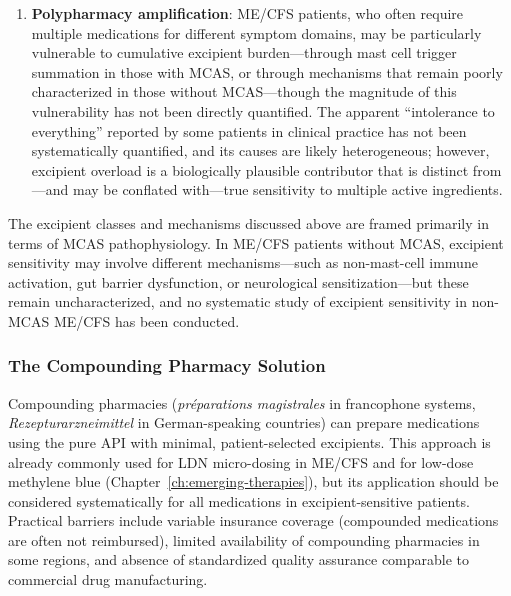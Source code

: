 \begin{enumerate}
    \item \textbf{Polypharmacy amplification}: ME/CFS patients, who often require multiple medications for different symptom domains, may be particularly vulnerable to cumulative excipient burden---through mast cell trigger summation in those with MCAS, or through mechanisms that remain poorly characterized in those without MCAS---though the magnitude of this vulnerability has not been directly quantified. The apparent ``intolerance to everything'' reported by some patients in clinical practice has not been systematically quantified, and its causes are likely heterogeneous; however, excipient overload is a biologically plausible contributor that is distinct from---and may be conflated with---true sensitivity to multiple active ingredients.
\end{enumerate}

The excipient classes and mechanisms discussed above are framed primarily in terms of MCAS pathophysiology. In ME/CFS patients without MCAS, excipient sensitivity may involve different mechanisms---such as non-mast-cell immune activation, gut barrier dysfunction, or neurological sensitization---but these remain uncharacterized, and no systematic study of excipient sensitivity in non-MCAS ME/CFS has been conducted.

\subsubsection{The Compounding Pharmacy Solution}
\label{sec:compounding-general}

Compounding pharmacies (\emph{préparations magistrales} in francophone systems, \emph{Rezepturarzneimittel} in German-speaking countries) can prepare medications using the pure API with minimal, patient-selected excipients. This approach is already commonly used for LDN micro-dosing in ME/CFS and for low-dose methylene blue (Chapter~\ref{ch:emerging-therapies}), but its application should be considered systematically for all medications in excipient-sensitive patients. Practical barriers include variable insurance coverage (compounded medications are often not reimbursed), limited availability of compounding pharmacies in some regions, and absence of standardized quality assurance comparable to commercial drug manufacturing.

